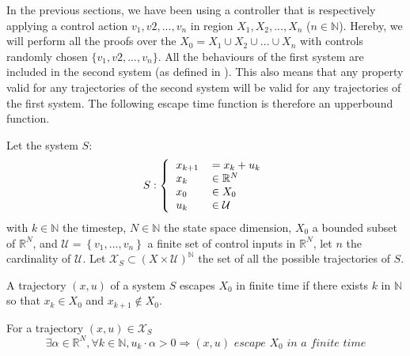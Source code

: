 In the previous sections, we have been using a controller that is respectively applying a control action $v_1,v2,...,v_n$ in region $X_1,X_2,...,X_n$ ($n \in \mathbb{N}$). Hereby, we will perform all the proofs over the $X_0 = X_1 \cup X_2 \cup ... \cup X_n$ with controls randomly chosen $\{v_1,v2,...,v_n\}$.
All the behaviours of the first system are included in the second system (as defined in \cite{tabuada2009verification}). This also means that any property valid for any trajectories of the second system will be valid for any trajectories of the first system. The following escape time function is therefore an upperbound function.

Let the system $S$:
\begin{equation}
S:\left \{
  \begin{tabular}{ll}
  $x_{k+1}$ &$= x_k + u_k$\\
  $x_k$ & $\in \mathbb{R}^N$\\
  $x_0$ & $\in X_0$\\
  $u_k$ & $\in \mathcal{U}$
  \end{tabular}
\right.
\end{equation}
with $k \in \mathbb{N}$ the timestep, $N \in \mathbb{N}$ the state space dimension, $X_0$ a bounded subset of $\mathbb{R}^N$, and $\mathcal{U} = \left \{v_1,...,v_n \right \}$ a finite set of control inputs in $\mathbb{R}^N$, let $n$ the cardinality of $\mathcal{U}$.
Let $\mathcal{X}_S \subset (X \times \mathcal{U})^{\mathbb{N}}$ the set of all the possible trajectories of $S$.

\begin{definition}
A trajectory $(x,u)$ of a system $S$ escapes $X_0$ in finite time if there exists $k$ in $\mathbb{N}$ so that $x_k \in X_0$ and $x_{k+1} \notin X_0$.
\end{definition}

\begin{property} \label{prop_escape}
For a trajectory $(x,u) \in \mathcal{X}_S$ 
$$
\exists \alpha \in \mathbb{R}^N, \forall k \in \mathbb{N}, u_k \cdot \alpha > 0
\Rightarrow
(x,u) \textit{ escape } X_0 \textit{ in a finite time} 
$$
\end{property}

